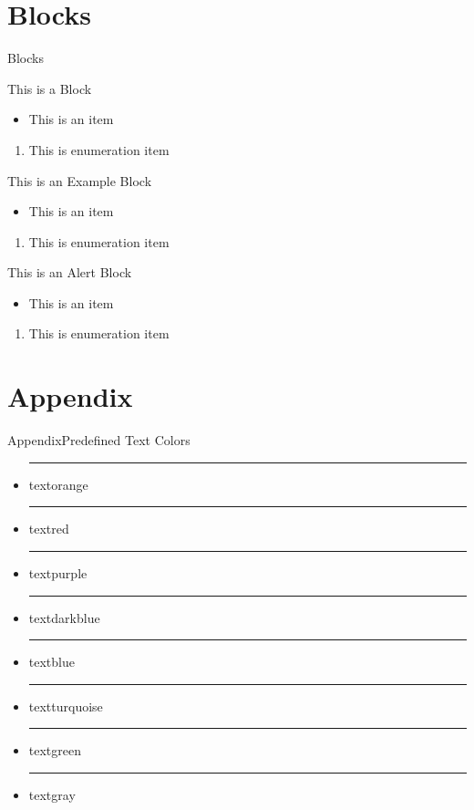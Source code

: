 \documentclass{beamer}
\begin{document}
\section{Blocks}
\begin{frame}[squeeze]{Blocks}
	\begin{block}{This is a Block}
		\begin{itemize}
			\item This is an item
		\end{itemize}
		\begin{enumerate}
			\item This is enumeration item
		\end{enumerate}
	\end{block}
	\begin{exampleblock}{This is an Example Block}
		\begin{itemize}
			\item This is an item
		\end{itemize}
		\begin{enumerate}
			\item This is enumeration item
		\end{enumerate}
	\end{exampleblock}
	\begin{alertblock}{This is an Alert Block}
		\begin{itemize}
			\item This is an item
		\end{itemize}
		\begin{enumerate}
			\item This is enumeration item
		\end{enumerate}
	\end{alertblock}
\end{frame}

\section{Appendix}
\appendix 

\begin{frame}{Appendix}{Predefined Text Colors}
	\begin{itemize}
		\item {\color{textorange}\rule{.7cm}{.4cm} textorange} 
		\item {\color{textred}\rule{.7cm}{.4cm} textred} 
		\item {\color{textpurple}\rule{.7cm}{.4cm} textpurple} 
		\item {\color{textdarkblue}\rule{.7cm}{.4cm} textdarkblue}
		\item {\color{textblue}\rule{.7cm}{.4cm} textblue}
		\item {\color{textturquoise}\rule{.7cm}{.4cm} textturquoise} 
		\item {\color{textgreen}\rule{.7cm}{.4cm} textgreen} 
		\item {\color{textgray}\rule{.7cm}{.4cm} textgray} 
	\end{itemize}
\end{frame}
\end{document}
